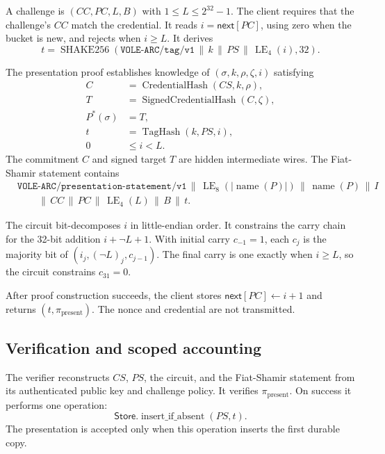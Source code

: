 \documentclass[11pt]{article}
\newcommand{\concat}{\,\|\,}
\newcommand{\LE}[1]{\operatorname{LE}_{#1}}
\newcommand{\XOF}{\operatorname{SHAKE256}}
\newcommand{\Store}{\ensuremath{\mathsf{Store}}}
\newcommand{\domain}[1]{\texttt{#1}}
\theoremstyle{remark}
\begin{document}
A challenge is $(CC,PC,L,B)$ with $1\leq L\leq 2^{32}-1$. The client requires
that the challenge's $CC$ match the credential. It reads
$i=\mathsf{next}[PC]$, using zero when the bucket is new, and rejects when
$i\geq L$. It derives
\[
  t = \XOF(\domain{VOLE-ARC/tag/v1}
           \concat k \concat PS \concat \LE{4}(i),32).
\]

The presentation proof establishes knowledge of
$(\sigma,k,\rho,\zeta,i)$ satisfying
\begin{align}
 C &= \operatorname{CredentialHash}(CS,k,\rho), \label{eq:cred-hash}\\
 T &= \operatorname{SignedCredentialHash}(C,\zeta), \label{eq:signed-hash}\\
 P^*(\sigma) &= T, \label{eq:mayo}\\
 t &= \operatorname{TagHash}(k,PS,i), \label{eq:tag}\\
 0 &\leq i < L. \label{eq:range}
\end{align}
The commitment $C$ and signed target $T$ are hidden intermediate wires.
The Fiat-Shamir statement contains
\[
\begin{split}
 &\domain{VOLE-ARC/presentation-statement/v1} \concat
 \LE{8}(|\operatorname{name}(P)|) \concat \operatorname{name}(P) \concat I\\
 &\qquad{}\concat CC \concat PC \concat \LE{4}(L) \concat B \concat t.
\end{split}
\]

The circuit bit-decomposes $i$ in little-endian order. It constrains the
carry chain for the 32-bit addition $i+\neg L+1$. With initial carry
$c_{-1}=1$, each $c_j$ is the majority bit of
$(i_j,{\left(\neg L\right)}_j,c_{j-1})$. The final carry is one exactly when
$i\geq L$, so the circuit constrains $c_{31}=0$.

After proof construction succeeds, the client stores
$\mathsf{next}[PC]\leftarrow i+1$ and returns $(t,\pi_{\mathrm{present}})$.
The nonce and credential are not transmitted.

\subsection{Verification and scoped accounting}

The verifier reconstructs $CS$, $PS$, the circuit, and the Fiat-Shamir
statement from its authenticated public key and challenge policy. It verifies
$\pi_{\mathrm{present}}$. On success it performs one operation:
\[
  \Store.\operatorname{insert\_if\_absent}(PS,t).
\]
The presentation is accepted only when this operation inserts the first
durable copy.
\end{document}
